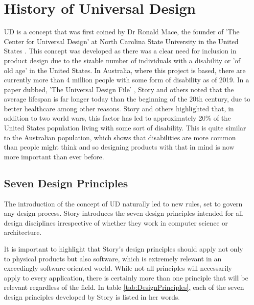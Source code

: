 \section{History of Universal Design} \label{History}
UD is a concept that was first coined by Dr Ronald Mace, the founder of 'The Center for Universal Design' at North Carolina State University in the United States \cite{ronald}.
This concept was developed as there was a clear need for inclusion in product design due to the sizable number of individuals with a disability or 'of old age' in the United States.
In Australia, where this project is based, there are currently more than 4 million people with some form of disability \cite{ausstats} as of 2019. 
In a paper dubbed, 'The Universal Design File' \cite{universalfile}, Story and others noted that the average lifespan is far longer today than the beginning of the 20th century, due to better healthcare among other reasons.
Story and others highlighted that, in addition to two world wars, this factor has led to approximately 20\% of the United States population living with some sort of disability.
This is quite similar to the Australian population, which shows that disabilities are more common than people might think and so designing products with that in mind is now more important than ever before.

\subsection{Seven Design Principles} \label{Seven Principles}

The introduction of the concept of UD naturally led to new rules, set to govern any design process.
Story introduces the seven design principles \cite{sevenprinciples} intended for all design disciplines irrespective of whether they work in computer science or architecture.

It is important to highlight that Story's design principles should apply not only to physical products but also software, which is extremely relevant in an exceedingly software-oriented world.
While not all principles will necessarily apply to every application, there is certainly more than one principle that will be relevant regardless of the field.
In table \ref{tab:DesignPrinciples}, each of the seven design principles developed by Story is listed in her words.


